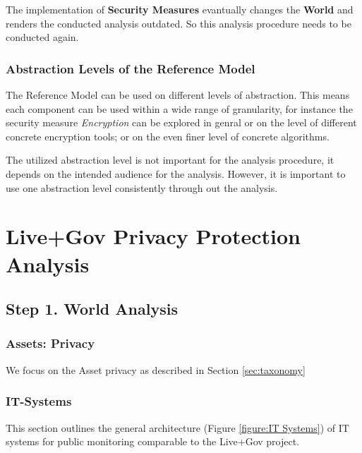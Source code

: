 The implementation of \textbf{Security Measures} evantually changes the
\textbf{World} and renders the conducted analysis outdated. So this
analysis procedure needs to be conducted again.

\subsubsection{Abstraction Levels of the Reference Model}

The Reference Model can be used on different levels of abstraction. This
means each component can be used within a wide range of granularity, for
instance the security measure \emph{Encryption} can be explored in
genral or on the level of different concrete encryption tools; or on the
even finer level of concrete algorithms.

The utilized abstraction level is not important for the analysis
procedure, it depends on the intended audience for the analysis.
However, it is important to use one abstraction level consistently
through out the analysis.


\pagebreak

\section{Live+Gov Privacy Protection Analysis}

\subsection{Step 1. World Analysis}

\subsubsection{Assets: Privacy}

We focus on the Asset privacy as described in Section \ref{sec:taxonomy}


\subsubsection{IT-Systems}
\label{subsubsection:it-systems}

This section outlines the general architecture (Figure \ref{figure:IT Systems}) of IT systems for public monitoring comparable to the Live+Gov project.

